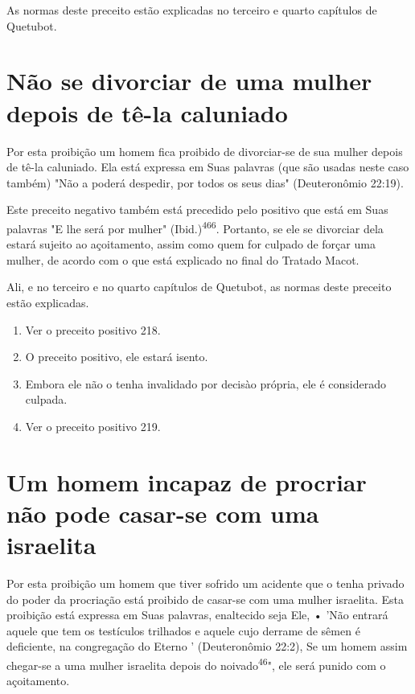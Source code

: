 \begin{itemize}
\begin{enumrate}
\begin{itemize}
\begin{itemize}
\begin{itemize}
As normas deste preceito estão explicadas no terceiro e quarto
capí­tulos de Quetubot.

\section{Não se divorciar de uma mulher depois de tê-la caluniado}

Por esta proibição um homem fica proibido de divorciar-se de sua mulher
depois de tê-la caluniado. Ela está expressa em Suas palavras (que são
usadas neste caso também) "Não a poderá despedir, por todos os seus
dias" (Deuteronômio 22:19).

Este preceito negativo também está precedido pelo positivo que es­tá em
Suas palavras "E lhe será por mulher" (Ibid.)\textsuperscript{466}.
Portanto, se ele se di­vorciar dela estará sujeito ao açoitamento, assim
como quem for culpado de forçar uma mulher, de acordo com o que está
explicado no final do Tratado Macot.

Ali, e no terceiro e no quarto capítulos de Quetubot, as normas des­te
preceito estão explicadas.


\begin{enumerate}
\def\labelenumi{\arabic{enumi}.}
\setcounter{enumi}{462}
\item
 
 Ver o preceito positivo 218.
 
\item
 
 O preceito positivo, ele estará isento.
 
\item
 
 Embora ele não o tenha invalidado por decisào própria, ele é
 considerado culpada.
 
\item
 
 Ver o preceito positivo 219.
 
\end{enumerate}



\section{Um homem incapaz de procriar não pode casar-se com uma israelita}

Por esta proibição um homem que tiver sofrido um acidente que o tenha
privado do poder da procriação está proibido de casar-se com uma mu­lher
israelita. Esta proibição está expressa em Suas palavras, enaltecido
seja Ele, • 'Não entrará aquele que tem os testículos trilhados e aquele
cujo derrame de sêmen é deficiente, na congregação do Eterno '
(Deuteronômio 22:2), Se um homem assim chegar-se a uma mulher israelita
depois do noivado\textsuperscript{46}", ele será punido com o
açoitamento.



\end{itemize}
\end{itemize}
\end{itemize}
\end{enumrate}
\end{itemize}
